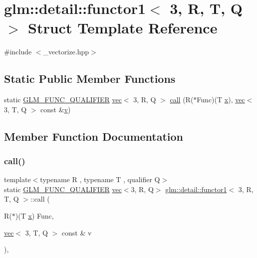 \hypertarget{structglm_1_1detail_1_1functor1_3_013_00_01_r_00_01_t_00_01_q_01_4}{}\section{glm\+:\+:detail\+:\+:functor1$<$ 3, R, T, Q $>$ Struct Template Reference}
\label{structglm_1_1detail_1_1functor1_3_013_00_01_r_00_01_t_00_01_q_01_4}


{\ttfamily \#include $<$\+\_\+vectorize.\+hpp$>$}

\subsection*{Static Public Member Functions}
\begin{DoxyCompactItemize}
\item 
static \hyperlink{setup_8hpp_a33fdea6f91c5f834105f7415e2a64407}{G\+L\+M\+\_\+\+F\+U\+N\+C\+\_\+\+Q\+U\+A\+L\+I\+F\+I\+ER} \hyperlink{structglm_1_1vec}{vec}$<$ 3, R, Q $>$ \hyperlink{structglm_1_1detail_1_1functor1_3_013_00_01_r_00_01_t_00_01_q_01_4_a89ea8c7ead27b1a70ac9830eba529000}{call} (R($\ast$Func)(T \hyperlink{_s_d_l__opengl_8h_ad0e63d0edcdbd3d79554076bf309fd47}{x}), \hyperlink{structglm_1_1vec}{vec}$<$ 3, T, Q $>$ const \&\hyperlink{_s_d_l__opengl_8h_a10a82eabcb59d2fcd74acee063775f90}{v})
\end{DoxyCompactItemize}


\subsection{Member Function Documentation}
\mbox{\label{structglm_1_1detail_1_1functor1_3_013_00_01_r_00_01_t_00_01_q_01_4_a89ea8c7ead27b1a70ac9830eba529000}} 
\subsubsection{\texorpdfstring{call()}{call()}}
{\footnotesize\ttfamily template$<$typename R , typename T , qualifier Q$>$ \\
static \hyperlink{setup_8hpp_a33fdea6f91c5f834105f7415e2a64407}{G\+L\+M\+\_\+\+F\+U\+N\+C\+\_\+\+Q\+U\+A\+L\+I\+F\+I\+ER} \hyperlink{structglm_1_1vec}{vec}$<$3, R, Q$>$ \hyperlink{structglm_1_1detail_1_1functor1}{glm\+::detail\+::functor1}$<$ 3, R, T, Q $>$\+::call (\begin{DoxyParamCaption}\item[{R($\ast$)(T \hyperlink{_s_d_l__opengl_8h_ad0e63d0edcdbd3d79554076bf309fd47}{x})}]{Func,  }\item[{\hyperlink{structglm_1_1vec}{vec}$<$ 3, T, Q $>$ const \&}]{v }\end{DoxyParamCaption})\hspace{0.3cm}{\ttfamily [inline]}, {\ttfamily [static]}}



